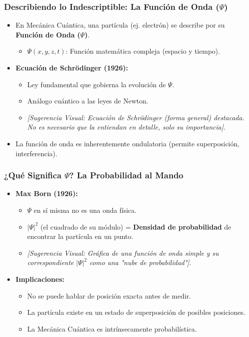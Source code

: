 \documentclass{beamer}
\begin{document}
	\begin{frame}
		\frametitle{Describiendo lo Indescriptible: La Función de Onda ($\Psi$)}
		\begin{itemize}
			\item En Mecánica Cuántica, una partícula (ej. electrón) se describe por su \textbf{Función de Onda ($\Psi$)}.
			\begin{itemize}
				\item $\Psi(x, y, z, t)$: Función matemática compleja (espacio y tiempo).
			\end{itemize} \pause
			\item \textbf{Ecuación de Schrödinger (1926):}
			\begin{itemize}
				\item Ley fundamental que gobierna la evolución de $\Psi$.
				\item Análogo cuántico a las leyes de Newton.
				\item \textit{[Sugerencia Visual: Ecuación de Schrödinger (forma general) destacada. No es necesario que la entiendan en detalle, solo su importancia]}.
			\end{itemize} \pause
			\item La función de onda es inherentemente ondulatoria (permite superposición, interferencia).
		\end{itemize}
	\end{frame}
	
	\begin{frame}
		\frametitle{¿Qué Significa $\Psi$? La Probabilidad al Mando}
		\begin{itemize}
			\item \textbf{Max Born (1926):}
			\begin{itemize}
				\item $\Psi$ en sí misma no es una onda física.
				\item $|\Psi|^2$ (el cuadrado de su módulo) = \textbf{Densidad de probabilidad} de encontrar la partícula en un punto.
				\item \textit{[Sugerencia Visual: Gráfica de una función de onda simple y su correspondiente $|\Psi|^2$ como una "nube de probabilidad"]}.
			\end{itemize} \pause
			\item \textbf{Implicaciones:}
			\begin{itemize}
				\item No se puede hablar de posición exacta antes de medir.
				\item La partícula existe en un estado de superposición de posibles posiciones.
				\item La Mecánica Cuántica es intrínsecamente probabilística.
			\end{itemize}
		\end{itemize}
	\end{frame}
	
\end{document}
